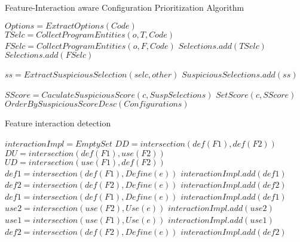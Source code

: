 \begin{algorithm}
\caption{Feature-Interaction aware Configuration Prioritization Algorithm}	
 \label{agl1}
\begin{algorithmic}[1]
\State $Options = ExtractOptions(Code)$
\State $TSelc = CollectProgramEntities(o, T, Code)$
\State $FSelc = CollectProgramEntities(o, F, Code)$
\State $Selections.add(TSelc)$
\State $Selections.add(FSelc)$
\EndFor

					\State $ss=ExtractSuspiciousSelection(selc, other)$
					\State $SuspiciousSelections.add(ss)$
				\EndIf
			\EndIf
	\EndFor
\EndFor
\EndProcedure
\Statex

	\State $SScore = CaculateSuspiciousScore(c, SuspSelections)$
	\State $SetScore(c, SScore)$
\EndFor
\State $OrderBySuspiciousScoreDesc(Configurations)$
\EndProcedure
\end{algorithmic}
\end{algorithm}




\begin{algorithm}
\caption{Feature interaction detection}	
 \label{alg_2}
\begin{algorithmic}[1]
\State $interactionImpl = EmptySet$
\State $DD = intersection(def(F1), def(F2))$
\State $DU = intersection(def(F1), use(F2))$
\State $UD = intersection(use(F1), def(F2))$
	\State $def1 = intersection(def(F1), Define(e))$
	\State $interactionImpl.add(def1)$
	\State $def2 = intersection(def(F2), Define(e))$
	\State $interactionImpl.add(def2)$
\EndFor
{}
	\State $def1 = intersection(def(F1), Define(e))$
	\State $interactionImpl.add(def1)$
	\State $use2 = intersection(use(F2), Use(e))$
	\State $interactionImpl.add(use2)$
\EndFor
{}
	\State $use1 = intersection(use(F1), Use(e))$
	\State $interactionImpl.add(use1)$
	\State $def2 = intersection(def(F2), Define(e))$
	\State $interactionImpl.add(def2)$
\EndFor
\EndProcedure
\Statex
\end{algorithmic}
\end{algorithm}